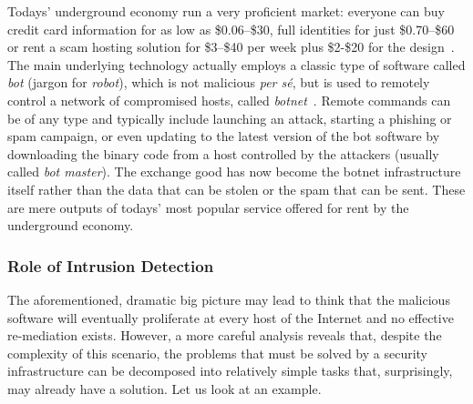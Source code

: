 \documentclass[12pt]{article}
\theoremstyle{definition}
\begin{document}
		Todays' underground economy run a very proficient market: everyone can buy credit card information for as low as \$0.06--\$30, full identities for just \$0.70--\$60 or rent a scam hosting solution for \$3--\$40 per week plus \$2-\$20 for the design~\cite{symantec_threat_report_2017}.\\ 	 

		The main underlying technology actually employs a classic type of software called \emph{bot} (jargon for \emph{robot}), which is not malicious \emph{per s\'e}, but is used to remotely control a network of compromised hosts, called \emph{botnet}~\cite{holz}. Remote commands can be of any type and typically include launching an attack, starting a phishing or spam campaign, or even updating to the latest version of the bot software by downloading the binary code from a host controlled by the attackers (usually called \emph{bot master})\cite{Airehrour2016}. The exchange good has now become the botnet infrastructure itself rather than the data that can be stolen or the spam that can be sent\cite{Ojha2017}. These are mere outputs of todays' most popular service offered for rent by the underground economy.
		
		\subsubsection{Role of Intrusion Detection}
		
		The aforementioned, dramatic big picture may lead to think that the malicious software will eventually proliferate at every host of the Internet and no effective re-mediation exists. However, a more careful analysis reveals that, despite the complexity of this scenario, the problems that must be solved by a security infrastructure can be decomposed into relatively simple tasks that, surprisingly, may already have a solution\cite{Gupta2016}. Let us look at an example.
			
\end{document}
